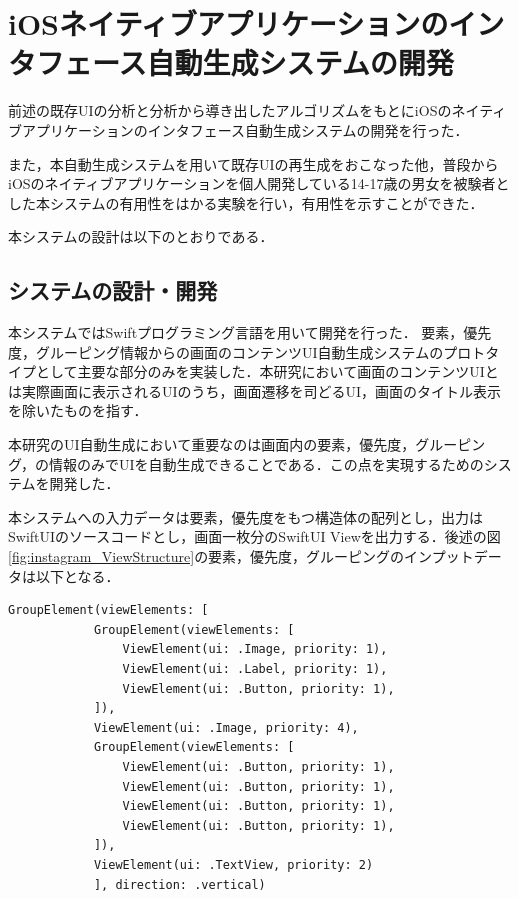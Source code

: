 \chapter{iOSネイティブアプリケーションのインタフェース自動生成システムの開発}
\label{chap:impl}
前述の既存UIの分析と分析から導き出したアルゴリズムをもとにiOSのネイティブアプリケーションのインタフェース自動生成システムの開発を行った．

また，本自動生成システムを用いて既存UIの再生成をおこなった他，普段からiOSのネイティブアプリケーションを個人開発している14-17歳の男女を被験者とした本システムの有用性をはかる実験を行い，有用性を示すことができた．

本システムの設計は以下のとおりである．
\section{システムの設計・開発}

本システムではSwiftプログラミング言語を用いて開発を行った．
要素，優先度，グルーピング情報からの画面のコンテンツUI自動生成システムのプロトタイプとして主要な部分のみを実装した．本研究において画面のコンテンツUIとは実際画面に表示されるUIのうち，画面遷移を司どるUI，画面のタイトル表示を除いたものを指す．

本研究のUI自動生成において重要なのは画面内の要素，優先度，グルーピング，の情報のみでUIを自動生成できることである．この点を実現するためのシステムを開発した．

本システムへの入力データは要素，優先度をもつ構造体の配列とし，出力はSwiftUIのソースコードとし，画面一枚分のSwiftUI Viewを出力する．後述の図\ref{fig:instagram_ViewStructure}の要素，優先度，グルーピングのインプットデータは以下となる．

\begin{lstlisting}
GroupElement(viewElements: [
            GroupElement(viewElements: [
                ViewElement(ui: .Image, priority: 1),
                ViewElement(ui: .Label, priority: 1),
                ViewElement(ui: .Button, priority: 1),
            ]),
            ViewElement(ui: .Image, priority: 4),
            GroupElement(viewElements: [
                ViewElement(ui: .Button, priority: 1),
                ViewElement(ui: .Button, priority: 1),
                ViewElement(ui: .Button, priority: 1),
                ViewElement(ui: .Button, priority: 1),                    
            ]),
            ViewElement(ui: .TextView, priority: 2)
            ], direction: .vertical)
\end{lstlisting}

